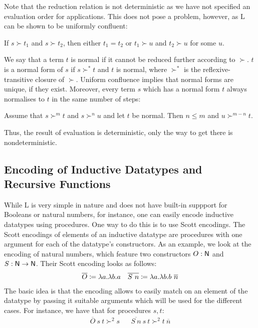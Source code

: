 Note that the reduction relation is not deterministic as we have not specified an evaluation order for applications. This does not pose a problem, however, as L can be shown to be uniformly confluent: 
\begin{fact}
  If $s \succ t_1$ and $s \succ t_2$, then either $t_1 = t_2$ or $t_1 \succ u$ and $t_2 \succ u$ for some $u$.
\end{fact}
We say that a term $t$ is normal if it cannot be reduced further according to $\succ$. $t$ is a normal form of $s$ if $s \succ^* t$ and $t$ is normal, where $\succ^*$ is the reflexive-transitive closure of $\succ$.
Uniform confluence implies that normal forms are unique, if they exist. Moreover, every term $s$ which has a normal form $t$ always normalises to $t$ in the same number of steps: 
\begin{corollary}
  Assume that $s \succ^m t$ and $s \succ^n u$ and let $t$ be normal. Then $n \le m$ and $u \succ^{m - n} t$.
\end{corollary}
Thus, the result of evaluation is deterministic, only the way to get there is nondeterministic.

\subsection{Encoding of Inductive Datatypes and Recursive Functions}
While L is very simple in nature and does not have built-in suppport for Booleans or natural numbers, for instance, one can easily encode inductive datatypes using procedures. One way to do this is to use Scott encodings. 
The Scott encodings of elements of an inductive datatype are procedures with one argument for each of the datatype's constructors. 
As an example, we look at the encoding of natural numbers, which feature two constructors $O : \mathsf{N}$ and $S : \mathsf{N} \rightarrow \mathsf{N}$.
Their Scott encoding looks as follows: 
\begin{align*}
  \overline{O} \coloneqq \lambda a. \lambda b. a 
  && \overline{S~n} \coloneqq \lambda a. \lambda b. b~\overline{n}
\end{align*}
The basic idea is that the encoding allows to easily match on an element of the datatype by passing it suitable arguments which will be used for the different cases. 
For instance, we have that for procedures $s, t$: 
\begin{align*}
  \overline{O}~s~t \succ^2 s && \overline{S~n}~s~t \succ^2 t~\overline{n} 
\end{align*}

